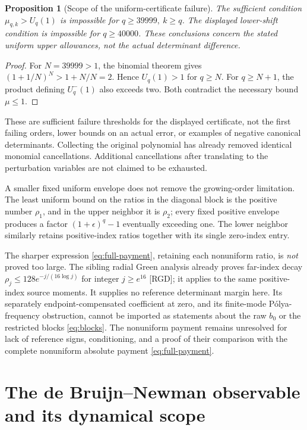 \documentclass[11pt,letterpaper]{article}
\numberwithin{equation}{section}
\newtheorem{proposition}[theorem]{Proposition}
\theoremstyle{remark}
\newcommand{\evid}[1]{\textsf{[#1]}}
\begin{document}
\begin{proposition}[Scope of the uniform-certificate failure]
\label{prop:ceiling}
The sufficient condition \(\mu_{q,k}>U_q(1)\) is impossible
for \(q\ge39999,\ k\ge q\). The displayed lower-shift condition
is impossible for \(q\ge40000\).
These conclusions concern the stated uniform upper allowances,
not the actual determinant difference.
\end{proposition}
\begin{proof}
For \(N=39999>1\), the binomial theorem gives
\((1+1/N)^N>1+N/N=2\). Hence \(U_q(1)>1\) for \(q\ge N\).
For \(q\ge N+1\), the product defining \(U_q^-(1)\) also exceeds
two. Both contradict the necessary bound \(\mu\le1\).
\end{proof}

These are sufficient failure thresholds for the displayed
certificate, not the first failing orders, lower bounds on an
actual error, or examples of negative canonical determinants.
Collecting the original polynomial has already removed identical
monomial cancellations. Additional cancellations after translating
to the perturbation variables are not claimed to be exhausted.

A smaller fixed uniform envelope does not remove the growing-order
limitation. The least uniform bound on the ratios in the diagonal
block is the positive number \(\rho_1\), and in the upper neighbor
it is \(\rho_2\); every fixed positive envelope produces a factor
\((1+\epsilon)^q-1\) eventually exceeding one. The lower neighbor
similarly retains positive-index ratios together with its single
zero-index entry.

The sharper expression \eqref{eq:full-payment}, retaining each
nonuniform ratio, is \emph{not} proved too large.
The sibling radial Green analysis already proves far-index decay
\(\rho_j\le128e^{-j/(16\log j)}\) for integer \(j\ge e^{16}\)
\evid{RGD}; it applies to the same positive-index source moments.
It supplies no reference determinant margin here. Its separately
endpoint-compensated coefficient at zero, and its finite-mode
P\'olya-frequency obstruction, cannot be imported as statements
about the raw \(b_0\) or the restricted blocks \eqref{eq:blocks}.
The nonuniform payment remains unresolved for lack of reference
signs, conditioning, and a proof of their comparison with the
complete nonuniform absolute payment \eqref{eq:full-payment}.

\section{The de Bruijn--Newman observable and its dynamical scope}
\label{sec:newman}
\end{document}
